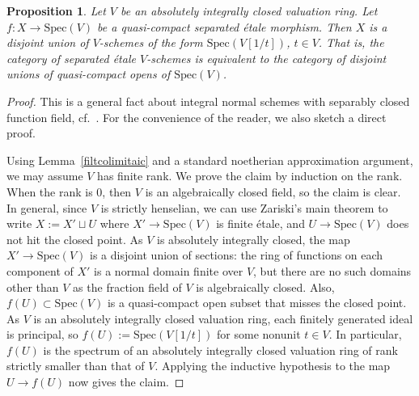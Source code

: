 \documentclass[reqno]{amsart}
\newcommand{\spec}{\mathrm{Spec}}
\newtheorem{proposition}[theorem]{Proposition}
\theoremstyle{definition}
\begin{document}
\begin{proposition} 
\label{etaleaic}
Let $V$ be an absolutely integrally closed valuation ring. Let $f\colon X \to \spec(V)$ be a quasi-compact separated \'etale
morphism. Then $X$ is a disjoint union of $V$-schemes of the form $\spec(
V[1/t])$, $t \in V$. That is, the category of separated \'etale $V$-schemes is equivalent
to the category of disjoint unions of quasi-compact opens of $\spec(V)$. 
\end{proposition} 
\begin{proof} 
This is a general fact about integral normal schemes with separably closed
function field, cf.~\cite[Tag 0EZN]{stacks-project}. For the convenience of the reader, we also sketch a direct proof.

Using Lemma~\ref{filtcolimitaic} and a standard noetherian approximation argument, we may assume $V$ has finite rank. We prove the claim by induction on the rank. When the rank is $0$, then $V$ is an algebraically closed field, so the claim is clear. In general, since $V$ is strictly henselian, we can use Zariski's main theorem to write $X := X' \sqcup U$ where $X' \to \mathrm{Spec}(V)$ is finite \'etale, and $U \to \mathrm{Spec}(V)$ does not hit the closed point. As $V$ is absolutely integrally closed, the map $X' \to \mathrm{Spec}(V)$ is a disjoint union of sections: the ring of functions on each component of $X'$ is a normal domain finite over $V$, but there are no such domains other than $V$ as the fraction field of $V$ is algebraically closed.  Also, $f(U) \subset \mathrm{Spec}(V)$ is a quasi-compact open subset that misses the closed point. As $V$ is an 
absolutely integrally closed 
valuation ring, each finitely generated ideal is principal, so $f(U) :=
\mathrm{Spec}(V[1/t])$ for some nonunit $t \in V$. In particular, $f(U)$ is the
spectrum of an
absolutely integrally closed 
valuation ring of rank strictly smaller than that of $V$. Applying the inductive hypothesis to the map $U \to f(U)$ now gives the claim.
\end{proof} 
\end{document}
